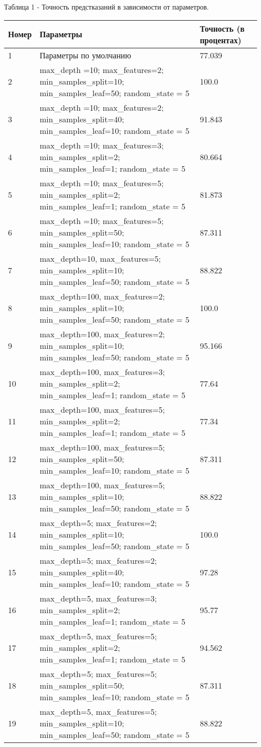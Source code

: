 \documentclass[a4paper,12pt]{article}
\begin{document}
	\vspace{0.5cm}
	Таблица 1 - Точность предстказаний в зависимости от параметров.
\begin{longtable}{|p{0.5cm}|p{10cm}|p{3cm}|}
Номер & Параметры & Точность (в процентах) \\ 
\hline 
1 & Параметры по умолчанию & 77.039 \\
\hline
2 & max\_depth =10; max\_features=2; min\_samples\_split=10; min\_samples\_leaf=50; random\_state = 5 & 100.0 \\
\hline 
3 & max\_depth =10; max\_features=2; min\_samples\_split=40; min\_samples\_leaf=10; random\_state = 5  & 91.843 \\
\hline 
4 & max\_depth =10; max\_features=3; min\_samples\_split=2; min\_samples\_leaf=1; random\_state = 5 & 80.664 \\
\hline 
5 & max\_depth =10; max\_features=5; min\_samples\_split=2; min\_samples\_leaf=1; random\_state = 5 & 81.873 \\
\hline
6 & max\_depth =10; max\_features=5; min\_samples\_split=50; min\_samples\_leaf=10; random\_state = 5 & 87.311 \\
\hline  
7 & max\_depth=10, max\_features=5; min\_samples\_split=10; min\_samples\_leaf=50; random\_state = 5 & 88.822 \\
\hline
8 & max\_depth=100, max\_features=2; min\_samples\_split=10; min\_samples\_leaf=50; random\_state = 5 & 100.0 \\
\hline 
9 & max\_depth=100, max\_features=2; min\_samples\_split=10; min\_samples\_leaf=50; random\_state = 5 & 95.166 \\
\hline
10 & max\_depth=100, max\_features=3; min\_samples\_split=2; min\_samples\_leaf=1; random\_state = 5 & 77.64 \\
\hline
11 & max\_depth=100, max\_features=5; min\_samples\_split=2; min\_samples\_leaf=1; random\_state = 5 & 77.34 \\
\hline
12 & max\_depth=100, max\_features=5; min\_samples\_split=50; min\_samples\_leaf=10; random\_state = 5 & 87.311 \\
\hline
13 & max\_depth=100, max\_features=5; min\_samples\_split=10; min\_samples\_leaf=50; random\_state = 5 & 88.822 \\
\hline 
14 & max\_depth=5; max\_features=2; min\_samples\_split=10; min\_samples\_leaf=50; random\_state = 5  & 100.0 \\
\hline 
15 & max\_depth=5; max\_features=2; min\_samples\_split=40; min\_samples\_leaf=10; random\_state = 5  & 97.28 \\
\hline 
16 & max\_depth=5, max\_features=3; min\_samples\_split=2; min\_samples\_leaf=1; random\_state = 5 & 95.77 \\
\hline
17 & max\_depth=5, max\_features=5; min\_samples\_split=2; min\_samples\_leaf=1; random\_state = 5 & 94.562 \\
\hline
18 & max\_depth=5; max\_features=5; min\_samples\_split=50; min\_samples\_leaf=10; random\_state = 5  & 87.311 \\
\hline
19 & max\_depth=5, max\_features=5; min\_samples\_split=10; min\_samples\_leaf=50; random\_state = 5 & 88.822 \\
\hline 



\end{longtable}
\end{document}
